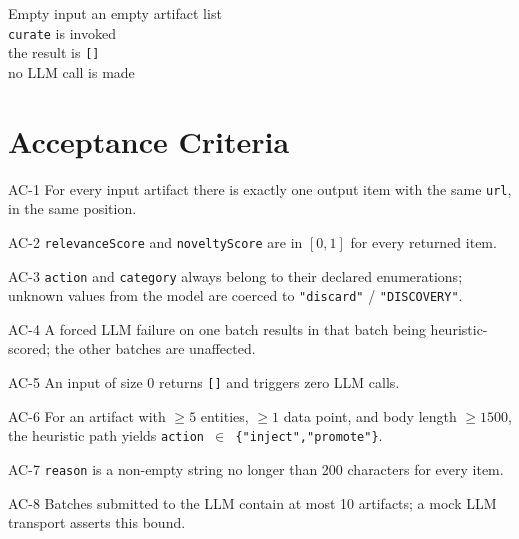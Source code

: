 \begin{scenario}{Empty input}
\Given an empty artifact list \\
\When \texttt{curate} is invoked \\
\Then the result is \texttt{[]} \\
\And no LLM call is made
\end{scenario}

\section{Acceptance Criteria}

\begin{ac}{AC-1}
For every input artifact there is exactly one output item with the same \texttt{url}, in the same position.
\end{ac}

\begin{ac}{AC-2}
\texttt{relevanceScore} and \texttt{noveltyScore} are in \([0,1]\) for every returned item.
\end{ac}

\begin{ac}{AC-3}
\texttt{action} and \texttt{category} always belong to their declared enumerations; unknown values from the model are coerced to \texttt{"discard"} / \texttt{"DISCOVERY"}.
\end{ac}

\begin{ac}{AC-4}
A forced LLM failure on one batch results in that batch being heuristic-scored; the other batches are unaffected.
\end{ac}

\begin{ac}{AC-5}
An input of size 0 returns \texttt{[]} and triggers zero LLM calls.
\end{ac}

\begin{ac}{AC-6}
For an artifact with \(\ge 5\) entities, \(\ge 1\) data point, and body length \(\ge 1500\), the heuristic path yields \texttt{action \(\in\) \{"inject","promote"\}}.
\end{ac}

\begin{ac}{AC-7}
\texttt{reason} is a non-empty string no longer than 200 characters for every item.
\end{ac}

\begin{ac}{AC-8}
Batches submitted to the LLM contain at most 10 artifacts; a mock LLM transport asserts this bound.
\end{ac}

